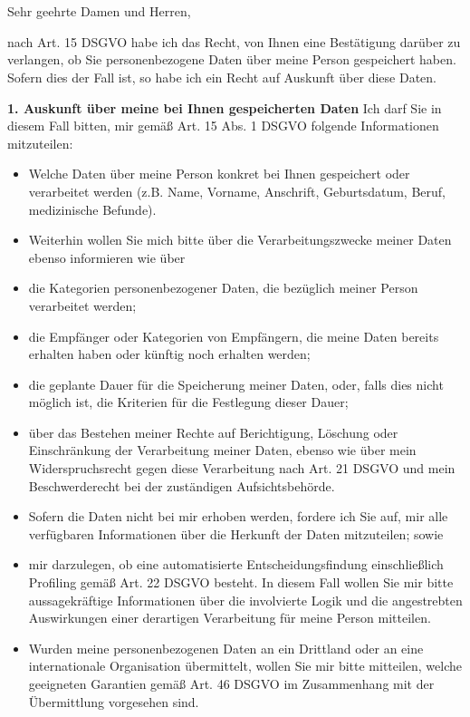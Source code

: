 \documentclass[a4paper, pagenumber=footmiddle, parskip=half,
	foldmarks=true,foldmarks=BmT, fromalign=right,
	fromphone=false, fromfax=false, fromemail=true, fromurl=false, fromlogo=false,
	fromrule=false, version=last]{scrlttr2}
\begin{document}
\begin{letter}{
	\EmpfaengerName\\
	\EmpfaengerStrasse\\
	\EmpfaengerStadt
}
\flushleft
\opening{Sehr geehrte Damen und Herren,}

nach Art. 15 DSGVO habe ich das Recht, von Ihnen eine Bestätigung darüber zu verlangen, ob Sie personenbezogene Daten über meine Person gespeichert haben. Sofern dies der Fall ist, so habe ich ein Recht auf Auskunft über diese Daten.

\textbf{1. Auskunft über meine bei Ihnen gespeicherten Daten}
Ich darf Sie in diesem Fall bitten, mir gemäß Art. 15 Abs. 1 DSGVO folgende Informationen mitzuteilen:

\begin{itemize} 
	\item Welche Daten über meine Person konkret bei Ihnen gespeichert oder verarbeitet werden (z.B. Name, Vorname, Anschrift, Geburtsdatum, Beruf, medizinische Befunde).
	\item Weiterhin wollen Sie mich bitte über die Verarbeitungszwecke meiner Daten ebenso informieren wie über
	\item die Kategorien personenbezogener Daten, die bezüglich meiner Person verarbeitet werden;
	\item die Empfänger oder Kategorien von Empfängern, die meine Daten bereits erhalten haben oder künftig noch erhalten werden;
	\item die geplante Dauer für die Speicherung meiner Daten, oder, falls dies nicht möglich ist, die Kriterien für die Festlegung dieser Dauer;
	\item über das Bestehen meiner Rechte auf Berichtigung, Löschung oder Einschränkung der Verarbeitung meiner Daten, ebenso wie über mein Widerspruchsrecht gegen diese Verarbeitung nach Art. 21 DSGVO und mein Beschwerderecht bei der zuständigen Aufsichtsbehörde.
	\item Sofern die Daten nicht bei mir erhoben werden, fordere ich Sie auf, mir alle verfügbaren Informationen über die Herkunft der Daten mitzuteilen; sowie
	\item mir darzulegen, ob eine automatisierte Entscheidungsfindung einschließlich Profiling gemäß Art. 22 DSGVO besteht. In diesem Fall wollen Sie mir bitte aussagekräftige Informationen über die involvierte Logik und die angestrebten Auswirkungen einer derartigen Verarbeitung für meine Person mitteilen.
	\item Wurden meine personenbezogenen Daten an ein Drittland oder an eine internationale Organisation übermittelt, wollen Sie mir bitte mitteilen, welche geeigneten Garantien gemäß Art. 46 DSGVO im Zusammenhang mit der Übermittlung vorgesehen sind.
\end{itemize}


\end{letter}
\end{document}
